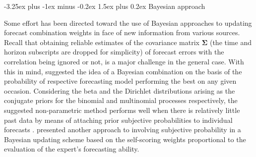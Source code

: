 \documentclass[11pt]{article}
\makeatletter
\renewcommand{\paragraph}{\@startsection{paragraph}{4}{0ex}%
   {-3.25ex plus -1ex minus -0.2ex}%
   {1.5ex plus 0.2ex}%
   {\normalfont\normalsize\bfseries}}
\makeatother
\begin{document}
\paragraph{Bayesian approach}

Some effort has been directed toward the use of Bayesian approaches to updating forecast combination weights in face of new information from various sources. Recall that obtaining reliable estimates of the covariance matrix $\boldsymbol{\Sigma}$ (the time and horizon subscripts are dropped for simplicity) of forecast errors with the correlation being ignored or not, is a major challenge in the general case. With this in mind, \cite{Bunn1975-vz} suggested the idea of a Bayesian combination on the basis of the probability of respective forecasting model performing the best on any given occasion. Considering the beta and the Dirichlet distributions arising as the conjugate priors for the binomial and multinomial processes respectively, the suggested non-parametric method performs well when there is relatively little past data by means of attaching prior subjective probabilities to individual forecasts \citep{Bunn1985-vo,De_Menezes2000-vd}. \cite{Oller1978-wx} presented another approach to involving subjective probability in a Bayesian updating scheme based on the self-scoring weights proportional to the evaluation of the expert's forecasting ability.
\end{document}
